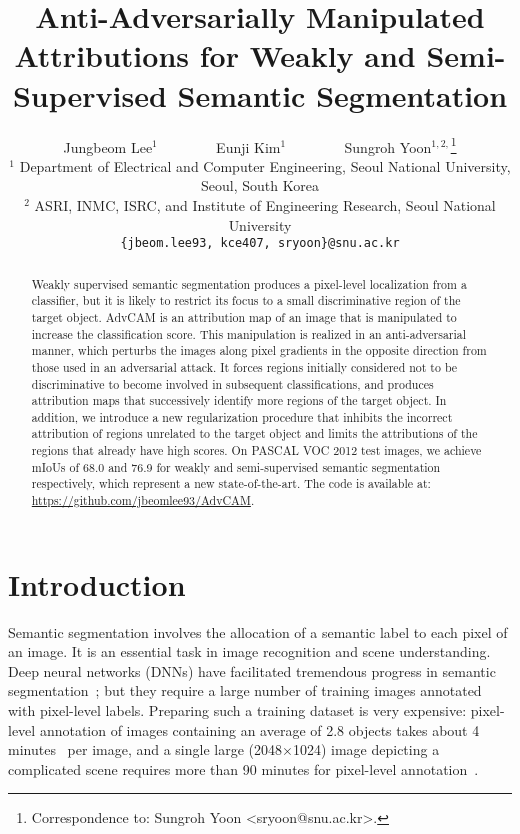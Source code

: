 \documentclass[final]{cvpr}
\begin{document}
\title{Anti-Adversarially Manipulated Attributions for Weakly and Semi-Supervised Semantic Segmentation}


\author{Jungbeom Lee$^1$ ~~~~~~~ Eunji Kim$^1$ ~~~~~~~  Sungroh Yoon$^{1, 2, }$\thanks{Correspondence to: Sungroh Yoon <sryoon@snu.ac.kr>.}\\
$^1$ Department of Electrical and Computer Engineering, Seoul National University, Seoul, South Korea\\
$^2$ ASRI, INMC, ISRC, and Institute of Engineering Research, Seoul National University\\
{\tt\small \{jbeom.lee93, kce407, sryoon\}@snu.ac.kr}}



\maketitle


\begin{abstract}
\vspace{-0.3em}
Weakly supervised semantic segmentation produces a pixel-level localization from a classifier, but it is likely to restrict its focus to a small discriminative region of the target object. AdvCAM is an attribution map of an image that is manipulated to increase the classification score. This manipulation is realized in an anti-adversarial manner, which perturbs the images along pixel gradients in the opposite direction from those used in an adversarial attack. It forces regions initially considered not to be discriminative to become involved in subsequent classifications, and produces attribution maps that successively identify more regions of the target object. 
In addition, we introduce a new regularization procedure that inhibits the incorrect attribution of regions unrelated to the target object and limits the attributions of the regions that already have high scores.
On PASCAL VOC 2012 test images, we achieve mIoUs of 68.0 and 76.9 for weakly and semi-supervised semantic segmentation respectively, which represent a new state-of-the-art.
The code is available at: \url{https://github.com/jbeomlee93/AdvCAM}.

\end{abstract}

\vspace{-0.8em}
\section{Introduction}\label{intro}
Semantic segmentation involves the allocation of a semantic label to each pixel of an image.
It is an essential task in image recognition and scene understanding.
Deep neural networks (DNNs) have facilitated tremendous progress in semantic segmentation~\cite{chen2017deeplab, huang2019ccnet}; but they require a large number of training images annotated with pixel-level labels. Preparing such a training dataset is very expensive: pixel-level annotation of images containing an average of 2.8 objects takes about 4 minutes~\cite{bearman2016s} per image, and a single large (2048$\times$1024) image depicting a complicated scene requires more than 90 minutes for pixel-level annotation~\cite{cordts2016cityscapes}. 
\end{document}
